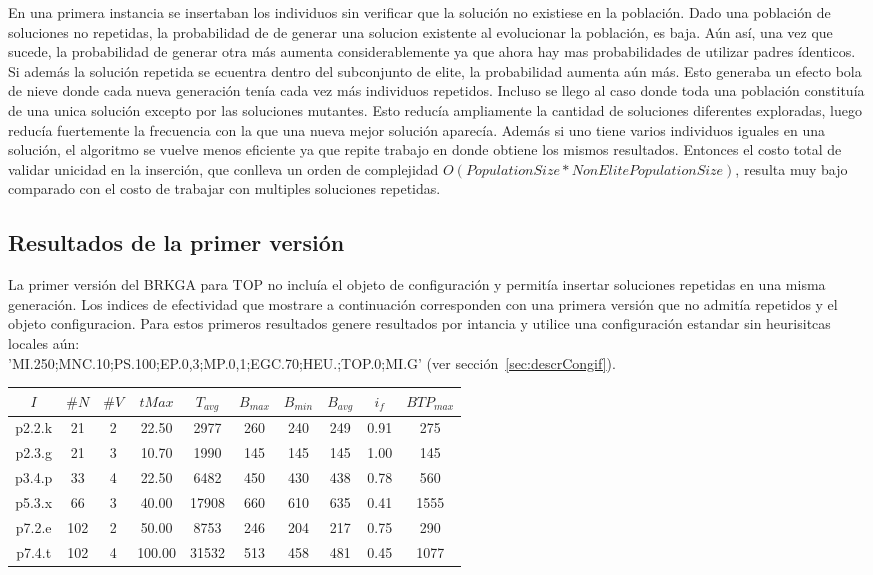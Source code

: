 \bigskip

En una primera instancia se insertaban los individuos sin verificar que la solución no existiese en la población. Dado una población de soluciones no repetidas, la probabilidad de de generar una solucion existente al evolucionar la población, es baja. Aún así, una vez que sucede, la probabilidad de generar otra más aumenta considerablemente ya que ahora hay mas probabilidades de utilizar padres ídenticos. Si además la solución repetida se ecuentra dentro del subconjunto de elite, la probabilidad aumenta aún más. Esto generaba un efecto bola de nieve donde cada nueva generación tenía cada vez más individuos repetidos. Incluso se llego al caso donde toda una población constituía de una unica solución excepto por las soluciones mutantes. Esto reducía ampliamente la cantidad de soluciones diferentes exploradas, luego reducía fuertemente la frecuencia con la que una nueva mejor solución aparecía. Además si uno tiene varios individuos iguales en una solución, el algoritmo se vuelve menos eficiente ya que repite trabajo en donde obtiene los mismos resultados. Entonces el costo total de validar unicidad en la inserción, que conlleva un orden de complejidad $O(PopulationSize * NonElitePopulationSize)$, resulta muy bajo comparado con el costo de trabajar con multiples soluciones repetidas.

\subsection{Resultados de la primer versión}

La primer versión del BRKGA para TOP no incluía el objeto de configuración y permitía insertar soluciones repetidas en una misma generación. Los indices de efectividad que mostrare a continuación corresponden con una primera versión que no admitía repetidos y el objeto configuracion. Para estos primeros resultados genere resultados por intancia y utilice una configuración estandar sin heurisitcas locales aún:\\ 'MI.250;MNC.10;PS.100;EP.0,3;MP.0,1;EGC.70;HEU.;TOP.0;MI.G' (ver sección~\ref{sec:descrCongif}).

\bigskip

\begin{center}
\begin{tabular}{ |c|c|c|c|c|c|c|c|c|c| } 
 \hline
$I$ & $\#N$ & $\#V$ & $tMax$ & $T_{avg}$ & $B_{max}$ & $B_{min}$ & $B_{avg}$ & $i_{f}$ & $BTP_{max}$ \\
\hline
p2.2.k & 21 & 2 & 22.50 & 2977 & 260 & 240 & 249 & 0.91 & 275  \\
p2.3.g & 21 & 3 & 10.70 & 1990 & 145 & 145 & 145 & 1.00 & 145  \\
p3.4.p & 33 & 4 & 22.50 & 6482 & 450 & 430 & 438 & 0.78 & 560  \\
p5.3.x & 66 & 3 & 40.00 & 17908 & 660 & 610 & 635 & 0.41 & 1555  \\
p7.2.e & 102 & 2 & 50.00 & 8753 & 246 & 204 & 217 & 0.75 & 290  \\
p7.4.t & 102 & 4 & 100.00 & 31532 & 513 & 458 & 481 & 0.45 & 1077  \\
\hline
\end{tabular}
\end{center}

